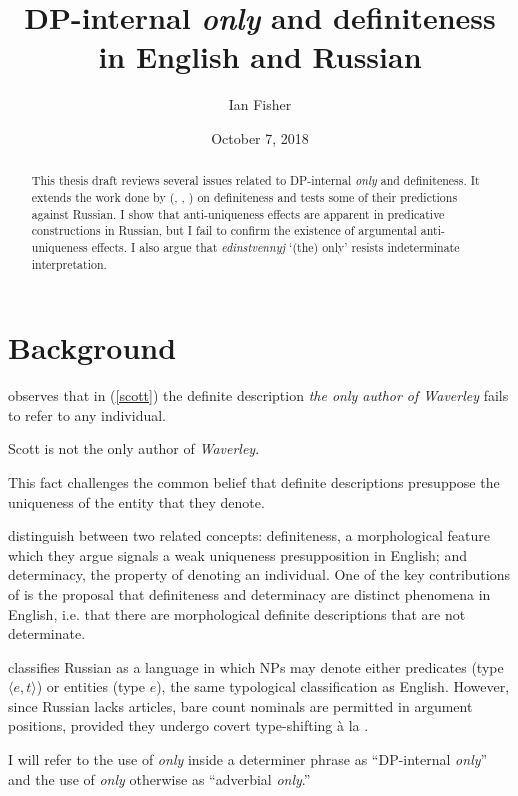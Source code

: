 \documentclass{article}
\title{DP-internal \textit{only} and definiteness in English and Russian}
\author{Ian Fisher}
\date{October 7, 2018}
\begin{document}
\maketitle


\begin{abstract}
This thesis draft reviews several issues related to DP-internal \textit{only} and definiteness. It extends the work done by \citeauthor{cb2015} (\citeyear{cb2012a}, \citeyear{cb2012b}, \citeyear{cb2015}) on definiteness and tests some of their predictions against Russian. I show that anti-uniqueness effects are apparent in predicative constructions in Russian, but I fail to confirm the existence of argumental anti-uniqueness effects. I also argue that \textit{edinstvennyj} `(the) only' resists indeterminate interpretation.
\end{abstract}


\section{Background}
\citet{cb2015} observes that in (\ref{scott}) the definite description \textit{the only author of Waverley} fails to refer to any individual.

\begin{exe}
	\ex \label{scott} Scott is not the only author of \textit{Waverley}.
\end{exe}

This fact challenges the common belief that definite descriptions presuppose the uniqueness of the entity that they denote.

\citeauthor{cb2015} distinguish between two related concepts: definiteness, a morphological feature which they argue signals a weak uniqueness presupposition in English; and determinacy, the property of denoting an individual. One of the key contributions of \citet{cb2015} is the proposal that definiteness and determinacy are distinct phenomena in English, i.e. that there are morphological definite descriptions that are not determinate.


\citet{chierchia98} classifies Russian as a language in which NPs may denote either predicates (type $\langle e, t \rangle$) or entities (type $e$), the same typological classification as English. However, since Russian lacks articles, bare count nominals are permitted in argument positions, provided they undergo covert type-shifting \`{a} la \citet{partee86}.

I will refer to the use of \textit{only} inside a determiner phrase as ``DP-internal \textit{only}'' and the use of \textit{only} otherwise as ``adverbial \textit{only}.''
\end{document}
